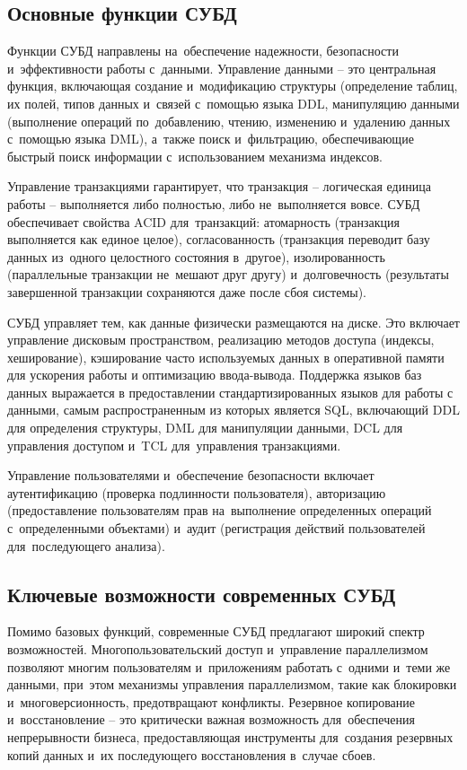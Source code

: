 \documentclass{ou}
\begin{document}
\subsection{Основные функции СУБД}
Функции СУБД направлены на~обеспечение надежности, безопасности и~эффективности работы с~данными. Управление данными -- это центральная функция, включающая создание и~модификацию структуры (определение таблиц, их полей, типов данных и~связей с~помощью языка DDL, манипуляцию данными (выполнение операций по~добавлению, чтению, изменению и~удалению данных с~помощью языка DML), а~также поиск и~фильтрацию, обеспечивающие быстрый поиск информации с~использованием механизма индексов.

Управление транзакциями гарантирует, что транзакция -- логическая единица работы -- выполняется либо полностью, либо не~выполняется вовсе. СУБД обеспечивает свойства ACID для~транзакций: атомарность (транзакция выполняется как единое целое), согласованность (транзакция переводит базу данных из~одного целостного состояния в~другое), изолированность (параллельные транзакции не~мешают друг другу) и~долговечность (результаты завершенной транзакции сохраняются даже после сбоя системы).

СУБД управляет тем, как данные физически размещаются на диске. Это включает управление дисковым пространством, реализацию методов доступа (индексы, хеширование), кэширование часто используемых данных в оперативной памяти для ускорения работы и оптимизацию ввода-вывода. Поддержка языков баз данных выражается в предоставлении стандартизированных языков для работы с данными, самым распространенным из которых является SQL, включающий DDL для определения структуры, DML для манипуляции данными, DCL для управления доступом и~TCL для~управления транзакциями.

Управление пользователями и~обеспечение безопасности включает аутентификацию (проверка подлинности пользователя), авторизацию (предоставление пользователям прав на~выполнение определенных операций с~определенными объектами) и~аудит (регистрация действий пользователей для~последующего анализа).
\subsection{Ключевые возможности современных СУБД}
Помимо базовых функций, современные СУБД предлагают широкий спектр возможностей. Многопользовательский доступ и~управление параллелизмом позволяют многим пользователям и~приложениям работать с~одними и~теми же данными, при~этом механизмы управления параллелизмом, такие как блокировки и~многоверсионность, предотвращают конфликты. Резервное копирование и~восстановление -- это критически важная возможность для~обеспечения непрерывности бизнеса, предоставляющая инструменты для~создания резервных копий данных и~их последующего восстановления в~случае сбоев.
\end{document}
